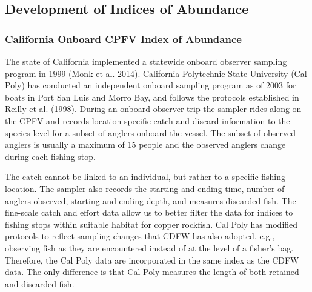 \documentclass[11pt,
  english,
  letterpaper,
]{article}
\begin{document}
\pagebreak

\hypertarget{development-of-indices-of-abundance}{%
\subsection{Development of Indices of Abundance}\label{development-of-indices-of-abundance}}

\hypertarget{onboard-cpfv-index}{%
\subsubsection{California Onboard CPFV Index of Abundance}\label{onboard-cpfv-index}}

The state of California implemented a statewide onboard observer sampling program in 1999 (Monk et al. 2014). California Polytechnic State University (Cal Poly) has conducted an independent onboard sampling program as of 2003 for boats in Port San Luis and Morro Bay, and follows the protocols established in Reilly et al. (1998). During an onboard observer trip the sampler rides along on the CPFV and records location-specific catch and discard information to the species level for a subset of anglers onboard the vessel. The subset of observed anglers is usually a maximum of 15 people and the observed anglers change during each fishing stop.

The catch cannot be linked to an individual, but rather to a specific fishing location. The sampler also records the starting and ending time, number of anglers observed, starting and ending depth, and measures discarded fish. The fine-scale catch and effort data allow us to better filter the data for indices to fishing stops within suitable habitat for copper rockfish. Cal Poly has modified protocols to reflect sampling changes that CDFW has also adopted, e.g., observing fish as they are encountered instead of at the level of a fisher's bag. Therefore, the Cal Poly data are incorporated in the same index as the CDFW data. The only difference is that Cal Poly measures the length of both retained and discarded fish.
\end{document}
